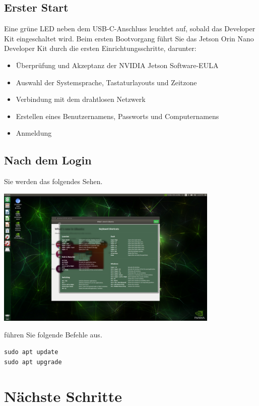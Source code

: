 \documentclass{article}
\begin{document}
\subsection{Erster Start}
Eine grüne LED neben dem USB-C-Anschluss leuchtet auf, sobald das Developer Kit eingeschaltet wird. Beim ersten Bootvorgang führt Sie das Jetson Orin Nano Developer Kit durch die ersten Einrichtungsschritte, darunter:

\begin{itemize}
    \item Überprüfung und Akzeptanz der NVIDIA Jetson Software-EULA
    \item Auswahl der Systemsprache, Tastaturlayouts und Zeitzone
    \item Verbindung mit dem drahtlosen Netzwerk
    \item Erstellen eines Benutzernamens, Passworts und Computernamens
    \item Anmeldung
\end{itemize}

\subsection{Nach dem Login}
Sie werden das folgendes Sehen.

\begin{center}
    \includegraphics[width=0.8\textwidth ]{jetson_booted_screen.png}
\end{center}
\par \bigskip 

führen Sie folgende Befehle aus. 
\begin{verbatim}
sudo apt update
sudo apt upgrade
\end{verbatim}
\clearpage
\section{Nächste Schritte}
\end{document}
